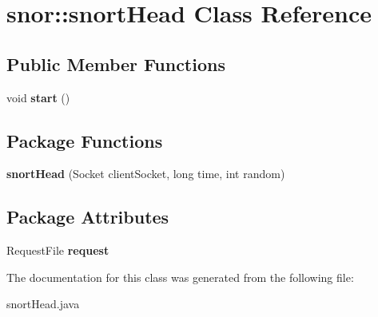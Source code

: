 \hypertarget{classsnor_1_1snortHead}{
\section{snor::snortHead Class Reference}
\label{classsnor_1_1snortHead}
}
\subsection*{Public Member Functions}
\begin{DoxyCompactItemize}
\item 
\hypertarget{classsnor_1_1snortHead_a0d221e30d30317a57e04bec461aab8a7}{
void {\bfseries start} ()}
\label{classsnor_1_1snortHead_a0d221e30d30317a57e04bec461aab8a7}

\end{DoxyCompactItemize}
\subsection*{Package Functions}
\begin{DoxyCompactItemize}
\item 
\hypertarget{classsnor_1_1snortHead_a95ca6dec79b6746a2b89c706627734fd}{
{\bfseries snortHead} (Socket clientSocket, long time, int random)}
\label{classsnor_1_1snortHead_a95ca6dec79b6746a2b89c706627734fd}

\end{DoxyCompactItemize}
\subsection*{Package Attributes}
\begin{DoxyCompactItemize}
\item 
\hypertarget{classsnor_1_1snortHead_ac8712850d07b84cb98ff09d4db2a7154}{
RequestFile {\bfseries request}}
\label{classsnor_1_1snortHead_ac8712850d07b84cb98ff09d4db2a7154}

\end{DoxyCompactItemize}


The documentation for this class was generated from the following file:\begin{DoxyCompactItemize}
\item 
snortHead.java\end{DoxyCompactItemize}
